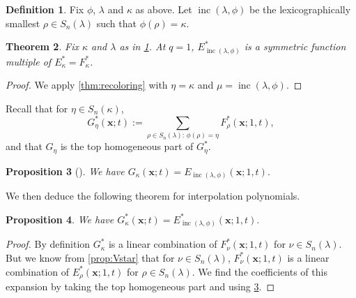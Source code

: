 \documentclass[12pt]{amsart}
\newtheorem{thm}{Theorem}[section]
\newtheorem{prop}[thm]{Proposition}
\theoremstyle{definition}
\newtheorem{definition}[thm]{Definition}
\newcommand{\bfx}{\boldsymbol{x}}
\DeclareMathOperator{\inc}{inc}
\begin{document}
\begin{appendices}
\begin{definition}\label{def:inc}
Fix $\phi$, $\lambda$ and $\kappa$ as above.
Let $\inc(\lambda,\phi)$ be the lexicographically smallest $\rho\in S_n(\lambda)$ such that $\phi(\rho)=\kappa$. 
\end{definition}

\begin{thm}\label{thm:E_inc_E}
    Fix $\kappa$ and $\lambda$ as in \cref{def:inc}. At $q=1$, $E^*_{\inc(\lambda,\phi)}$ is a symmetric function multiple of $E^*_\kappa=F^*_\kappa$.
    \end{thm}
 
\begin{proof}
    We apply \cref{thm:recoloring} with $\eta=\kappa$ and $\mu=\inc(\lambda,\phi)$.
\end{proof}


Recall that for $\eta\in S_n(\kappa)$, 
\begin{equation}\label{eq:G}
G^*_\eta(\bfx;t):=\sum_{\rho\in S_n(\lambda):\, \phi(\rho)=\eta} F^*_\rho(\bfx;1,t),
\end{equation}
and that $G_{\eta}$ is the top homogeneous part of $G^*_\eta$.

\begin{prop}[{\cite[Proposition 4.16]{AyyerMartinWilliams2025}}]\label{prop:hom_G}
    We have 
$G_\kappa(\bfx;t)=E_{\inc(\lambda,\phi)}(\bfx;1,t).$
\end{prop}
We then deduce the following theorem for interpolation polynomials.
\begin{prop}\label{prop:G_E}
    We have 
$G^*_\kappa(\bfx;t)=E^*_{\inc(\lambda,\phi)}(\bfx;1,t).$
\end{prop}
\begin{proof} By definition $G^*_\kappa$ is a linear combination of $F^*_\nu(\bfx;1,t)$ for $\nu\in S_n(\lambda)$. But we know from \cref{prop:Vstar} that for $\nu\in S_n(\lambda)$, $F^*_\nu(\bfx;1,t)$ is a linear combination of $E^*_\rho(\bfx;1,t)$ for $\rho\in S_n(\lambda)$. 
We find the coefficients of this expansion by taking the top homogeneous part and using \cref{prop:hom_G}.
\end{proof}



\end{appendices}
\end{document}

